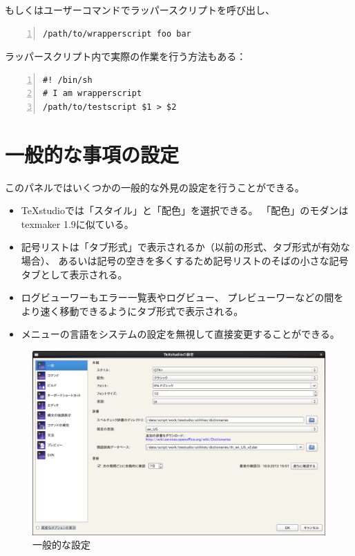 もしくはユーザーコマンドでラッパースクリプトを呼び出し、

\begin{lstlisting}[frame=single,breaklines=true,numbers=left]
/path/to/wrapperscript foo bar
\end{lstlisting}

ラッパースクリプト内で実際の作業を行う方法もある：

\begin{lstlisting}[frame=single,breaklines=true,numbers=left]
#! /bin/sh
# I am wrapperscript
/path/to/testscript $1 > $2
\end{lstlisting}

\section{一般的な事項の設定}

このパネルではいくつかの一般的な外見の設定を行うことができる。

\begin{itemize}
\item
  TeXstudioでは「スタイル」と「配色」を選択できる。
  「配色」のモダンはtexmaker 1.9に似ている。
\item
  記号リストは「タブ形式」で表示されるか（以前の形式、タブ形式が有効な場合）、
  あるいは記号の空きを多くするため記号リストのそばの小さな記号タブとして表示される。
\item
  ログビューワーもエラー一覧表やログビュー、
  プレビューワーなどの間をより速く移動できるようにタブ形式で表示される。
\item
  メニューの言語をシステムの設定を無視して直接変更することができる。
\end{itemize}

\begin{figure}[H]
  \centering
  \includegraphics[width=.8\linewidth]{configure_general.png}
  \caption{一般的な設定}
\end{figure}

